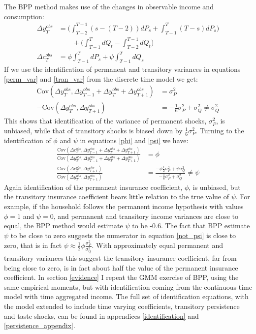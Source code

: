 \documentclass[titlepage]{\econtex}\newcommand{\texname}{BPP_TimeAgg}
\begin{document}
The BPP method makes use of the changes in observable income and consumption:
\begin{align}
\Delta y^{obs}_T &=  \Big(\int_{T-2}^{T-1} (s-(T-2))dP_s  + \int_{T-1}^{T} (T-s)dP_s \Big) \nonumber \\
& \qquad + \Big(\int_{T-1}^{T} dQ_t -\int_{T-2}^{T-1} dQ_t \Big) \label{deltay} \\
\Delta c^{obs}_T &= \phi  \int_{T-1}^{T} dP_s  +\psi \int_{T-1}^{T}dQ_s  \label{deltac}
\end{align}
If we use the identification of permanent and transitory variances in equations \ref{perm_var} and \ref{tran_var} from the discrete time model we get:
\begin{align*}
\mathrm{Cov}(\Delta y^{obs}_{T}, \Delta y^{obs}_{T-1}+\Delta y^{obs}_{T}+\Delta y^{obs}_{T+1}) &= \sigma^2_P\\
 -\mathrm{Cov}(\Delta y^{obs}_{T},\Delta y^{obs}_{T+1}) &= -\frac{1}{6}\sigma^2_P + \sigma^2_Q \neq \sigma^2_Q
\end{align*}
This shows that identification of the variance of permanent shocks, $\sigma^2_P$, is unbiased, while that of transitory shocks is biased down by $\frac{1}{6}\sigma^2_P$. Turning to the identification of $\phi$ and $\psi$ in equations \ref{phi} and \ref{psi} we have:
\begin{align}
\frac{\mathrm{Cov}(\Delta c^{obs}_{T}, \Delta y^{obs}_{T-1}+\Delta y^{obs}_{T}+\Delta y^{obs}_{T+1})}{\mathrm{Cov}(\Delta y^{obs}_{T}, \Delta y^{obs}_{T-1}+\Delta y^{obs}_{T}+\Delta y^{obs}_{T+1})}&= \phi\\
\frac{\mathrm{Cov}(\Delta c^{obs}_{T},\Delta y^{obs}_{T+1})}{\mathrm{Cov}(\Delta y^{obs}_{T},\Delta y^{obs}_{T+1})} &= \frac{-\phi\frac{1}{2}\sigma^2_P + \psi\sigma^2_Q}{-\frac{1}{6}\sigma^2_P + \sigma^2_Q} \neq \psi \label{not_psi}
\end{align}
Again identification of the permanent insurance coefficient, $\phi$, is unbiased, but the transitory insurance coefficient bears little relation to the true value of $\psi$. For example, if the household follows the permanent income hypothesis with values $\phi=1$ and $\psi=0$, and permanent and transitory income variances are close to equal, the BPP method would estimate $\psi$ to be -0.6. The fact that BPP estimate $\psi$ to be close to zero suggests the numerator in equation \ref{not_psi} is close to zero, that is in fact $\psi \approx \frac{1}{2}\phi \frac{\sigma^2_P}{\sigma^2_Q}$. With approximately equal permanent and transitory variances this suggest the transitory insurance coefficient, far from being close to zero, is in fact about half the value of the permanent insurance coefficient. In section \ref{evidence} I repeat the GMM exercise of BPP, using the same empirical moments, but with identification coming from the continuous time model with time aggregated income. The full set of identification equations, with the model extended to include time varying coefficients, transitory persistence and taste shocks, can be found in appendices \ref{identification} and \ref{persistence_appendix}.
\end{document}
